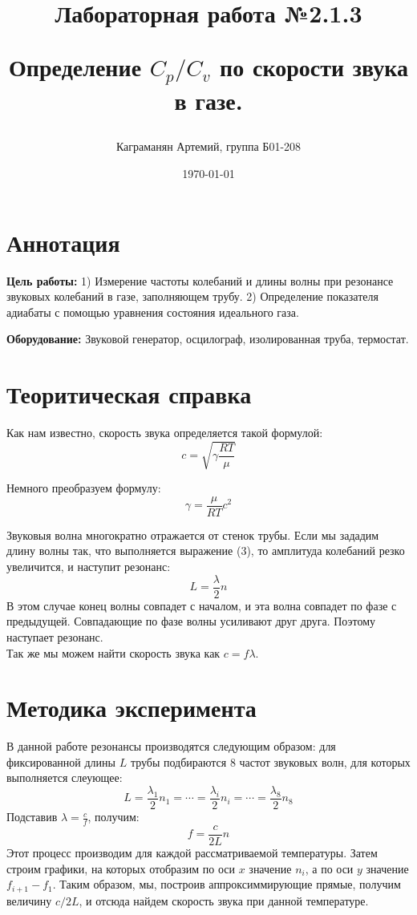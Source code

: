 \documentclass[a4paper, 12pt]{article}
\title{\begin{center}Лабораторная работа №2.1.3\end{center}
Определение \(C_p/C_v\) по скорости звука в газе.}
\author{Каграманян Артемий, группа Б01-208}
\date{\today}
\begin{document}
\maketitle

\section{Аннотация}

\textbf{Цель работы:} 1) Измерение частоты колебаний и длины волны при резонансе звуковых колебаний в газе, заполняющем трубу. 2) Определение показателя адиабаты с помощью уравнения состояния идеального газа.

\textbf{Оборудование:} Звуковой генератор, осцилограф, изолированная труба, термостат.

\section{Теоритическая справка}
Как нам известно, скорость звука определяется такой формулой:
\begin{equation}
  c = \sqrt{\gamma \frac{RT}{\mu}}
\end{equation}

Немного преобразуем формулу:
\begin{equation}
  \gamma = \frac{\mu}{RT}c^2
\end{equation}

Звуковыя волна многократно отражается от стенок трубы. Если мы зададим длину волны так, что выполняется выражение (3), то амплитуда колебаний резко увеличится, и наступит резонанс:
\begin{equation}
  L = \frac{\lambda}{2}n
\end{equation}
В этом случае конец волны совпадет с началом, и эта волна совпадет по фазе с предыдущей. Совпадающие по фазе волны усиливают друг друга. Поэтому наступает резонанс. \\
Так же мы можем найти скорость звука как \(c = f \lambda\). \\

\section{Методика эксперимента}
В данной работе резонансы производятся следующим образом: для фиксированной длины \(L\) трубы подбираются 8 частот звуковых волн, для которых выполняется слеующее:
\begin{equation}
  L = \frac{\lambda_{1}}{2}n_1 = \cdots = \frac{\lambda_{i}}{2}n_i = \cdots = \frac{\lambda_{8}}{2}n_8 
\end{equation}
Подставив $\lambda = \frac{c}{f}$, получим:
\begin{equation}
  f = \frac{c}{2L}n
\end{equation}
Этот процесс производим для каждой рассматриваемой температуры. Затем строим графики, на которых отобразим по оси \(x\) значение \(n_i\), а по оси \(y\) значение \(f_{i + 1} - f_1\).
Таким образом, мы, построив аппроксиммирующие прямые, получим величину \(c/2L\), и отсюда найдем скорость звука при данной температуре.
\end{document}
